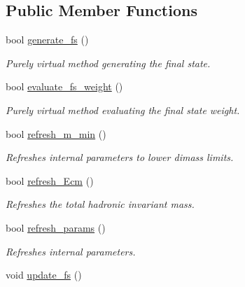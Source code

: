 \subsection*{Public Member Functions}
\begin{DoxyCompactItemize}
\item 
\hypertarget{a00446_a9c9972678485dd76033102b084c7bba4}{bool \hyperlink{a00446_a9c9972678485dd76033102b084c7bba4}{generate\-\_\-fs} ()}\label{a00446_a9c9972678485dd76033102b084c7bba4}

\begin{DoxyCompactList}\small\item\em Purely virtual method generating the final state. \end{DoxyCompactList}\item 
\hypertarget{a00446_a69d87f33d66f123671ef619b2ae2fdf2}{bool \hyperlink{a00446_a69d87f33d66f123671ef619b2ae2fdf2}{evaluate\-\_\-fs\-\_\-weight} ()}\label{a00446_a69d87f33d66f123671ef619b2ae2fdf2}

\begin{DoxyCompactList}\small\item\em Purely virtual method evaluating the final state weight. \end{DoxyCompactList}\item 
\hypertarget{a00446_ac85b2f98494b5d188a22bc544b522f80}{bool \hyperlink{a00446_ac85b2f98494b5d188a22bc544b522f80}{refresh\-\_\-m\-\_\-min} ()}\label{a00446_ac85b2f98494b5d188a22bc544b522f80}

\begin{DoxyCompactList}\small\item\em Refreshes internal parameters to lower dimass limits. \end{DoxyCompactList}\item 
\hypertarget{a00446_afcfa91f0eeef7a51174f20eee955d73f}{bool \hyperlink{a00446_afcfa91f0eeef7a51174f20eee955d73f}{refresh\-\_\-\-Ecm} ()}\label{a00446_afcfa91f0eeef7a51174f20eee955d73f}

\begin{DoxyCompactList}\small\item\em Refreshes the total hadronic invariant mass. \end{DoxyCompactList}\item 
\hypertarget{a00446_a48d729c158c88372bc0e0adde8c430c2}{bool \hyperlink{a00446_a48d729c158c88372bc0e0adde8c430c2}{refresh\-\_\-params} ()}\label{a00446_a48d729c158c88372bc0e0adde8c430c2}

\begin{DoxyCompactList}\small\item\em Refreshes internal parameters. \end{DoxyCompactList}\item 
\hypertarget{a00446_aa907a420620a321fe62e7be1adb96e6f}{void \hyperlink{a00446_aa907a420620a321fe62e7be1adb96e6f}{update\-\_\-fs} ()}\label{a00446_aa907a420620a321fe62e7be1adb96e6f}


\end{DoxyCompactItemize}
